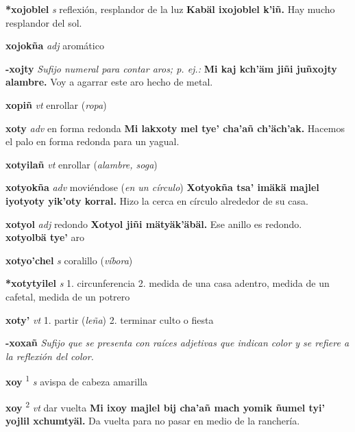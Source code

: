 \documentclass[10pt]{scrbook}
\newcommand{\entry}[1]{\textbf{#1}}
\newcommand{\onedefinition}[1]{#1.}
\newcommand{\defsuperscript}[1]{\textsuperscript{#1}}
\newcommand{\nontranslationdef}[1]{\textit{#1}}
\newcommand{\partofspeech}[1]{\textit{#1}}
\newcommand{\spanishtranslation}[1]{#1}
\newcommand{\clarification}[1]{(\textit{#1})}
\newcommand{\cholexample}[1]{\textbf{#1}}
\newcommand{\exampletranslation}[1]{#1}
\newcommand{\secondaryentry}[1]{\\\textbf{#1}}
\newcommand{\secondtranslation}[1]{#1}
\begin{document}
\begin{multicols}{2}
\entry{*xojoblel}
\partofspeech{s}
\spanishtranslation{reflexión, resplandor de la luz}
\cholexample{Kabäl ixojoblel k'iñ.}
\exampletranslation{Hay mucho resplandor del sol.}

\entry{xojokña}
\partofspeech{adj}
\spanishtranslation{aromático}

\entry{-xojty}
\nontranslationdef{Sufijo numeral para contar aros; p. ej.:}
\cholexample{Mi kaj kch'äm jiñi juñxojty alambre.}
\exampletranslation{Voy a agarrar este aro hecho de metal.}

\entry{xopiñ}
\partofspeech{vt}
\spanishtranslation{enrollar}
\clarification{ropa}

\entry{xoty}
\partofspeech{adv}
\spanishtranslation{en forma redonda}
\cholexample{Mi lakxoty mel tye' cha'añ ch'äch'ak.}
\exampletranslation{Hacemos el palo en forma redonda para un yagual.}

\entry{xotyilañ}
\partofspeech{vt}
\spanishtranslation{enrollar}
\clarification{alambre, soga}

\entry{xotyokña}
\partofspeech{adv}
\spanishtranslation{moviéndose}
\clarification{en un círculo}
\cholexample{Xotyokña tsa' imäkä majlel iyotyoty yik'oty korral.}
\exampletranslation{Hizo la cerca en círculo alrededor de su casa.}

\entry{xotyol}
\partofspeech{adj}
\spanishtranslation{redondo}
\cholexample{Xotyol jiñi mätyäk'äbäl.}
\exampletranslation{Ese anillo es redondo.}
\secondaryentry{xotyolbä tye'}
\secondtranslation{aro}

\entry{xotyo'chel}
\partofspeech{s}
\spanishtranslation{coralillo}
\clarification{víbora}

\entry{*xotytyilel}
\partofspeech{s}
\onedefinition{1}
\spanishtranslation{circunferencia}
\onedefinition{2}
\spanishtranslation{medida de una casa adentro, medida de un cafetal, medida de un potrero}

\entry{xoty'}
\partofspeech{vt}
\onedefinition{1}
\spanishtranslation{partir}
\clarification{leña}
\onedefinition{2}
\spanishtranslation{terminar culto o fiesta}

\entry{-xoxañ}
\nontranslationdef{Sufijo que se presenta con raíces adjetivas que indican color y se refiere a la reflexión del color.}

\entry{xoy}
\defsuperscript{1}
\partofspeech{s}
\spanishtranslation{avispa de cabeza amarilla}

\entry{xoy}
\defsuperscript{2}
\partofspeech{vt}
\spanishtranslation{dar vuelta}
\cholexample{Mi ixoy majlel bij cha'añ mach yomik ñumel tyi' yojlil xchumtyäl.}
\exampletranslation{Da vuelta para no pasar en medio de la ranchería.}


\end{multicols}
\end{document}
